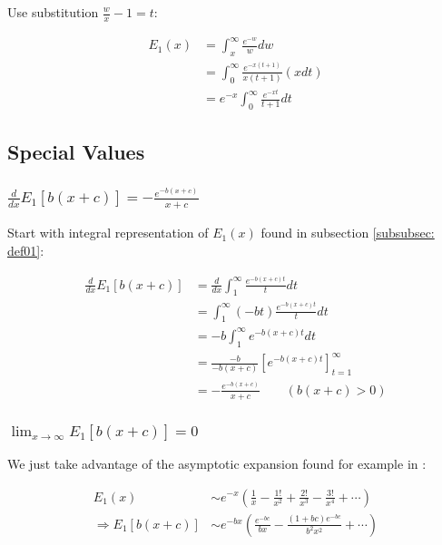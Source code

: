 \documentclass[bibliography=totocnumbered]{scrartcl}
\begin{document}
	Use substitution $\frac{w}{x}-1=t$:
	
	\begin{align}
		E_1\left(x\right)&=\int_{x}^{\infty}\frac{e^{-w}}{w}dw\\
		&=\int_{0}^{\infty}\frac{e^{-x\left(t+1\right)}}{x\left(t+1\right)}\left(xdt\right)\\
		&=e^{-x}\int_{0}^{\infty}\frac{e^{-xt}}{t+1}dt
	\end{align}
	
	\subsection{Special Values}
	
	\subsubsection[A derivative of E1]{$\frac{d}{dx}E_1\left[b\left(x+c\right)\right]=-\frac{e^{-b\left(x+c\right)}}{x+c}$}
	\label{subsubsec: specval_deriv}
	
	Start with integral representation of $E_1\left(x\right)$ found in subsection \ref{subsubsec: def01}:
	
	\begin{align}
		\frac{d}{dx}E_1\left[b\left(x+c\right)\right]&=\frac{d}{dx}\int_{1}^{\infty}\frac{e^{-b\left(x+c\right)t}}{t}dt\\
		&=\int_{1}^{\infty}\left(-bt\right)\frac{e^{-b\left(x+c\right)t}}{t}dt\\
		&=-b\int_{1}^{\infty}e^{-b\left(x+c\right)t}dt\\
		&=\frac{-b}{-b\left(x+c\right)}\left[e^{-b\left(x+c\right)t}\right]^{\infty}_{t=1}\\
		&=-\frac{e^{-b\left(x+c\right)}}{x+c}\qquad\left(b\left(x+c\right)>0\right)
	\end{align}
	
	\subsubsection[A limit of E1 as x approaches infinity]{$\lim_{x\rightarrow\infty}E_1\left[b\left(x+c\right)\right]=0$}
	\label{subsubsec: specval01}
	
	We just take advantage of the asymptotic expansion found for example in \cite{dlmfAsymExpansion}:
	
	\begin{align}
		E_1\left(x\right)&\sim{}e^{-x}\left(\frac{1}{x}-\frac{1!}{x^2}+\frac{2!}{x^3}-\frac{3!}{x^4}+\cdots\right)\\
		\Rightarrow{}E_1\left[b\left(x+c\right)\right]&\sim{}e^{-bx}\left(\frac{e^{-bc}}{bx}-\frac{\left(1+bc\right)e^{-bc}}{b^2x^2}+\cdots\right)
	\end{align}
	
\end{document}
